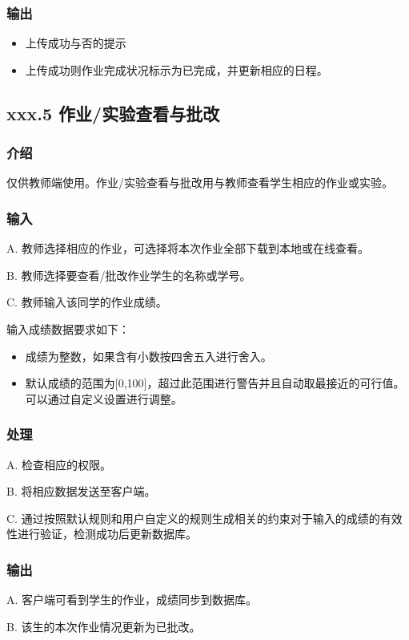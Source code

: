       \subsubsection{输出}
      \begin{itemize}
        \item 上传成功与否的提示
        \item 上传成功则作业完成状况标示为已完成，并更新相应的日程。
      \end{itemize}

    \subsection{xxx.5 作业/实验查看与批改}
      \subsubsection{介绍}
      仅供教师端使用。作业/实验查看与批改用与教师查看学生相应的作业或实验。
      \subsubsection{输入}
A. 教师选择相应的作业，可选择将本次作业全部下载到本地或在线查看。

B. 教师选择要查看/批改作业学生的名称或学号。

C. 教师输入该同学的作业成绩。

输入成绩数据要求如下：
  \begin{itemize}
   \item 成绩为整数，如果含有小数按四舍五入进行舍入。
   \item 默认成绩的范围为[0,100]，超过此范围进行警告并且自动取最接近的可行值。可以通过自定义设置进行调整。
 \end{itemize}
\subsubsection{处理}
A. 检查相应的权限。

B. 将相应数据发送至客户端。

C. 通过按照默认规则和用户自定义的规则生成相关的约束对于输入的成绩的有效性进行验证，检测成功后更新数据库。

\subsubsection{输出}
A. 客户端可看到学生的作业，成绩同步到数据库。

B. 该生的本次作业情况更新为已批改。

